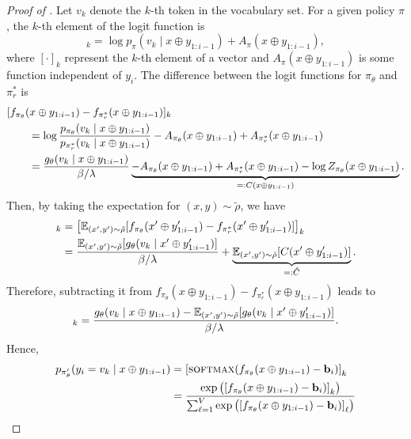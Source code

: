 \begin{proof}[Proof of ]
Let $v_k$ denote the $k$-th token in the vocabulary set.
For a given policy $\pi$, the $k$-th element of the logit function is
\begin{equation*}
[f_{\pi}(x \oplus y_{1:i-1})]_k = \log p_{\pi}(v_k \mid x \oplus y_{1:i-1}) + A_{\pi}(x\oplus y_{1:i-1}),
\end{equation*}
where $[\cdot]_k$ represent the $k$-th element of a vector and $A_{\pi}(x \oplus y_{1:i-1})$ is some function independent of $y_{i}$.
The difference between the logit functions for $\pi_\theta$ and $\pi_r^*$ is
\begin{align*}
\MoveEqLeft[2]
[f_{\pi_\theta}(x \oplus y_{1:i-1}) - f_{\pi_r^*}(x \oplus y_{1:i-1}) ]_k \\
&= \log \frac{p_{\pi_\theta}(v_k \mid x \oplus y_{1:i-1})}{p_{\pi_r^*}(v_k \mid x \oplus y_{1:i-1})} - A_{\pi_\theta}(x \oplus y_{1:i-1}) + A_{\pi_r^*}(x \oplus y_{1:i-1}) \\
&= \frac{g_\theta(v_k \mid x\oplus y_{1:i-1})}{\beta / \lambda} \underbrace{- A_{\pi_\theta}(x \oplus y_{1:i-1}) + A_{\pi_r^*}(x \oplus y_{1:i-1}) - \log Z_{\pi_\theta}(x \oplus y_{1:i-1})}_{ =: C(x \oplus y_{1:i-1})}.
\end{align*}
Then, by taking the expectation for $(x, y) \sim \tilde{\rho}$, we have
\begin{align*}
[\mathbf{b}_{i} ]_k
&= \left[ \E_{(x',y') \sim \rhot}[f_{\pi_\theta}(x' \oplus y_{1:i-1}') - f_{\pi_r^*}(x' \oplus y_{1:i-1}') ] \right]_k\\
&= \frac{\E_{(x',y') \sim \rhot}[g_\theta(v_k \mid x' \oplus y_{1:i-1}')]}{\beta / \lambda} + \underbrace{\E_{(x',y') \sim \rhot}[C(x' \oplus y_{1:i-1}')]}_{=: \tilde{C}}.
\end{align*}
Therefore, subtracting it from $f_{\pi_\theta}(x \oplus y_{1:i-1}) - f_{\pi_r^*}(x \oplus y_{1:i-1})$ leads to
\begin{equation*}
[f_{\pi_\theta}(x \oplus y_{1:i-1}) - f_{\pi_r^*}(x \oplus y_{1:i-1}) - \mathbf{b}_{i}]_{k}
= \frac{g_\theta(v_k \mid x \oplus y_{1:i-1} ) - \E_{(x',y') \sim \rhot}[g_\theta(v_k \mid x' \oplus y_{1:i-1}')]}{\beta / \lambda} .
\end{equation*}
Hence,
\begin{align*}
p_{\pi_\theta'}(y_i = v_{k} \mid x \oplus y_{1:i-1}) 
&= \left[ \textsc{softmax}(f_{\pi_\theta}(x \oplus y_{1:i-1}) - \mathbf{b}_{i})\right]_k \\
&= \frac{ \exp\left( \left[ f_{\pi_\theta}(x \oplus y_{1:i-1}) - \mathbf{b}_{i})\right]_k\right) }{ \sum_{\ell=1}^{V} \exp\left( \left[ f_{\pi_\theta}(x \oplus y_{1:i-1}) - \mathbf{b}_{i})\right]_\ell\right) } \\

\end{align*}
\end{proof}
